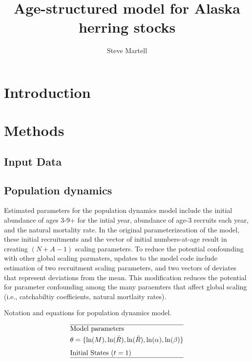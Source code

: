 \documentclass[12pt,letterpaper]{article}
\title{Age-structured model for Alaska herring stocks}
\author{Steve Martell}
\newcounter{saveEq}
\def\putEq{\setcounter{saveEq}{\value{equation}}}
\def\tableEq{ %
    \putEq \setcounter{equation}{0}
    \renewcommand{\theequation}{T\arabic{table}.\arabic{equation}}
    \vspace{-5mm}
    }
\begin{document}
  \maketitle

  \begin{abstract}
    

  \end{abstract}


  \section{Introduction} %
  \label{sec:introduction}

  

  \section{Methods} %
  \label{sec:methods}
  
  \subsection{Input Data} %
  \label{sub:input_data}
  

  \subsection{Population dynamics} %
  \label{sub:population_dynamics}
  
  Estimated parameters for the population dynamics model include the initial abundance of ages 3-9+ for the intial year, abundance of age-3 recruits each year, and the natural mortality rate. In the original parameterizeation of the model, these initial recruitments and the vector of initial numbers-at-age result in creating $(N + A-1)$ scaling parameters.  To reduce the potential confounding with other global scaling parmaters, updates to the model code include estimation of two recruitment scaling parameters, and two vectors of deviates that represent deviations from the mean. This modification reduces the potential for parameter confounding among the many paraemters that affect global scaling (i.e., catchabiltiy coefficients, natural mortlaity rates).

  \begin{table}
    \centering
    \caption{Notation and equations for population dynamics model.}
    \label{tab:PopulationDynamics}
    \tableEq
    \begin{align}
      \hline \nonumber
      & \mbox{Model parameters} \nonumber\\
      & \theta = \{\ln(M),\ln(\bar{R}),\ln(\ddot{R}), \ln(\alpha),\ln(\beta)\} \\[1ex]
      & \mbox{Initial States ($t=1$)} \nonumber \\
      \hline \nonumber
    \end{align}
  \end{table}
\end{document}

